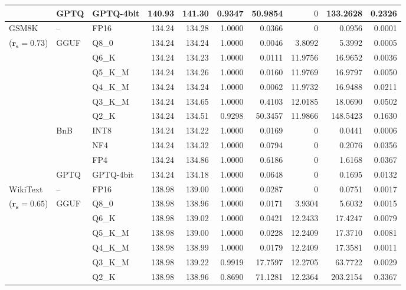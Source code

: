 \begin{longtable}{ll l rrrrrrr}
 & GPTQ & GPTQ-4bit & 140.93 & 141.30 & \cellcolor{red!18} 0.9347 & \cellcolor{red!18} 50.9854 & \cellcolor{cyan!12} $0$ & \cellcolor{red!18} 133.2628 & \cellcolor{red!18} 0.2326 \\
\midrule
GSM8K & -- & FP16 & 134.24 & 134.28 & 1.0000 & 0.0366 & \cellcolor{cyan!12} $0$ & 0.0956 & 0.0001 \\
{\small ($\mathbf{r_s{=}0.73}$)} & GGUF & Q8\_0 & 134.24 & 134.24 & 1.0000 & 0.0046 & 3.8092 & 5.3992 & 0.0005 \\
 &  & Q6\_K & 134.24 & 134.23 & 1.0000 & 0.0111 & 11.9756 & 16.9652 & 0.0036 \\
 &  & Q5\_K\_M & 134.24 & 134.26 & 1.0000 & 0.0160 & 11.9769 & 16.9797 & 0.0050 \\
 &  & Q4\_K\_M & 134.24 & 134.24 & 1.0000 & 0.0062 & 11.9732 & 16.9488 & 0.0211 \\
 &  & Q3\_K\_M & 134.24 & 134.65 & 1.0000 & 0.4103 & 12.0185 & 18.0690 & 0.0502 \\
 &  & Q2\_K & 134.24 & 134.51 & \cellcolor{red!18} 0.9298 & \cellcolor{red!18} 50.3457 & 11.9866 & \cellcolor{red!18} 148.5423 & \cellcolor{red!18} 0.1630 \\
 & BnB & INT8 & 134.24 & 134.22 & 1.0000 & 0.0169 & \cellcolor{cyan!12} $0$ & 0.0441 & 0.0006 \\
 &  & NF4 & 134.24 & 134.32 & 1.0000 & 0.0794 & \cellcolor{cyan!12} $0$ & 0.2076 & 0.0356 \\
 &  & FP4 & 134.24 & 134.86 & 1.0000 & 0.6186 & \cellcolor{cyan!12} $0$ & 1.6168 & 0.0367 \\
 & GPTQ & GPTQ-4bit & 134.24 & 134.18 & 1.0000 & 0.0648 & \cellcolor{cyan!12} $0$ & 0.1695 & 0.0132 \\
\midrule
WikiText & -- & FP16 & 138.98 & 139.00 & 1.0000 & 0.0287 & \cellcolor{cyan!12} $0$ & 0.0751 & 0.0017 \\
{\small ($\mathbf{r_s{=}0.65}$)} & GGUF & Q8\_0 & 138.98 & 138.96 & 1.0000 & 0.0171 & 3.9304 & 5.6032 & 0.0015 \\
 &  & Q6\_K & 138.98 & 139.02 & 1.0000 & 0.0421 & 12.2433 & 17.4247 & 0.0079 \\
 &  & Q5\_K\_M & 138.98 & 139.00 & 1.0000 & 0.0228 & 12.2409 & 17.3710 & 0.0081 \\
 &  & Q4\_K\_M & 138.98 & 138.99 & 1.0000 & 0.0179 & 12.2409 & 17.3581 & 0.0011 \\
 &  & Q3\_K\_M & 138.98 & 139.22 & 0.9919 & 17.7597 & 12.2705 & 63.7722 & 0.0029 \\
 &  & Q2\_K & 138.98 & 138.96 & \cellcolor{red!18} 0.8690 & \cellcolor{red!18} 71.1281 & 12.2364 & \cellcolor{red!18} 203.2154 & \cellcolor{red!18} 0.3367 \\

\end{longtable}
